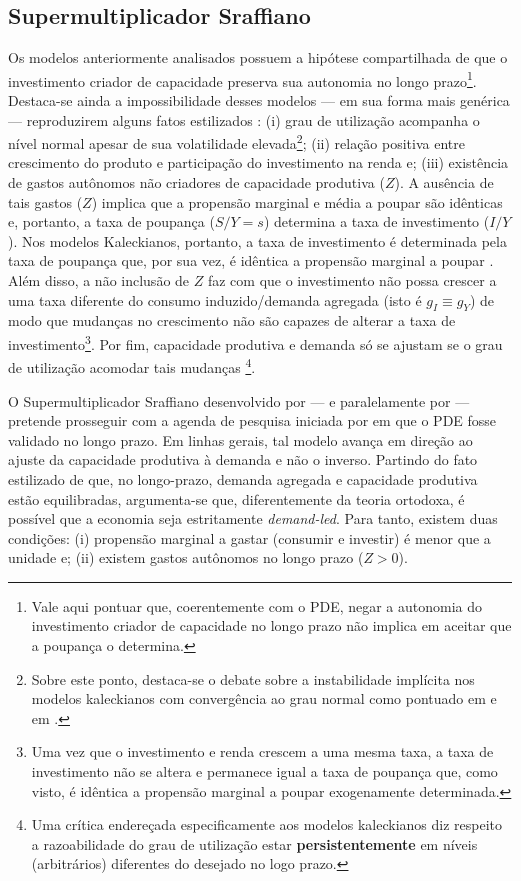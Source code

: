 \subsection{Supermultiplicador Sraffiano}



Os modelos anteriormente analisados possuem a hipótese compartilhada de que o investimento criador de capacidade preserva sua autonomia no longo prazo\footnote{Vale aqui pontuar que, coerentemente com o PDE, negar a autonomia do investimento criador de capacidade no longo prazo não implica em aceitar que a poupança o determina.}.  
Destaca-se ainda a impossibilidade desses modelos --- em sua forma mais genérica --- reproduzirem alguns fatos estilizados \cite[p.~5]{fagundes_role_2017}: 
	(i) grau de utilização acompanha o nível normal apesar de sua volatilidade elevada\footnote{Sobre este ponto, destaca-se o debate sobre a instabilidade implícita nos modelos kaleckianos com convergência ao grau normal como pontuado em \textcite{hein_instability_2011} e em \textcite{allain_tackling_2015}.}; 
	(ii) relação positiva entre crescimento do produto e participação do investimento na renda e;
	(iii) existência de gastos autônomos não criadores de capacidade produtiva ($Z$).
A ausência de tais gastos ($Z$) implica que a propensão marginal e média a poupar são idênticas e, portanto, a taxa de poupança ($S/Y = s$) determina a taxa de investimento ($I/Y$). Nos modelos Kaleckianos, portanto, a taxa de investimento é determinada pela taxa de poupança que, por sua vez, é idêntica a propensão marginal a poupar \cite[p.~7]{fagundes_role_2017}. Além disso, a não inclusão de $Z$ faz com que o investimento não possa crescer a uma taxa diferente do consumo induzido/demanda agregada (isto é $g_I \equiv g_Y$) de modo que mudanças no crescimento não são capazes de alterar a taxa de investimento\footnote{Uma vez que o investimento e renda crescem a uma mesma taxa, a taxa de investimento não se altera e permanece igual a taxa de poupança que, como visto, é idêntica a propensão marginal a poupar exogenamente determinada.}. Por fim, capacidade produtiva e demanda só se ajustam se o grau de utilização acomodar tais mudanças \cite[p.~84--86]{serrano_sraffian_2017}\footnote{Uma crítica endereçada especificamente aos modelos kaleckianos diz respeito a razoabilidade do grau de utilização estar \textbf{persistentemente} em níveis (arbitrários) diferentes do desejado no logo prazo.}.


O Supermultiplicador Sraffiano desenvolvido por \textcite{serrano_sraffian_1995} --- e paralelamente por \textcite{bortis_institutions_1996} --- pretende prosseguir com a agenda de pesquisa iniciada por \textcite[Original de 1962]{garegnani_problem_2015} em que o PDE fosse validado no longo prazo.  Em linhas gerais, tal modelo avança em direção ao ajuste da capacidade produtiva à demanda e não o inverso.
Partindo do fato estilizado de que, no longo-prazo, demanda agregada e capacidade produtiva estão equilibradas, argumenta-se que, diferentemente da teoria ortodoxa, é possível que a economia seja estritamente \textit{demand-led}. Para tanto, existem duas condições: (i) propensão marginal a gastar (consumir e investir) é menor que a unidade e; (ii) existem gastos autônomos no longo prazo ($Z > 0$).



